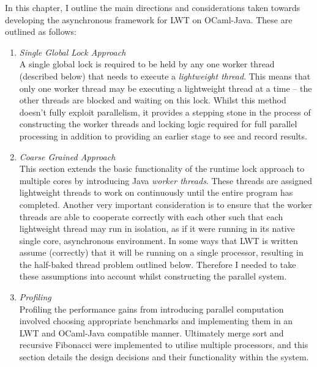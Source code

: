 \documentclass[12pt,twoside,notitlepage]{report}
\begin{document}
%
%

In this chapter, I outline the main directions and considerations taken towards developing the asynchronous framework for LWT on OCaml-Java. These are outlined as follows:
\begin{enumerate}
\item {\em Single Global Lock Approach} \hfill \\
A single global lock is required to be held by any one worker thread (described below) that needs to execute a {\em lightweight thread}. This means that only one worker thread may be executing a lightweight thread at a time -- the other
threads are blocked and waiting on this lock. Whilst this method doesn't fully exploit parallelism, it provides a stepping stone in the process of constructing the worker threads and locking logic required for full parallel processing
in addition to providing an earlier stage to see and record results.
\item {\em Coarse Grained Approach} \hfill \\
This section extends the basic functionality of the runtime lock approach to multiple cores by introducing Java {\em worker threads}. These threads are assigned lightweight threads to work on continuously until the entire program has
completed. Another very important consideration is to ensure that the worker threads are able to cooperate correctly with each other such that each lightweight thread may run in isolation, as if it were running in its native single core,
asynchronous environment. In some ways that LWT is written assume (correctly) that it will be running on a single processor, resulting in the half-baked thread problem outlined below. Therefore I needed to take these assumptions into
account whilst constructing the parallel system.
\item {\em Profiling} \hfill \\
Profiling the performance gains from introducing parallel computation involved choosing appropriate benchmarks and implementing them in an LWT and OCaml-Java compatible manner. Ultimately merge sort and recursive Fibonacci were
implemented to utilise multiple processors, and this section details the design decisions and their functionality within the system.
\end{enumerate}
\end{document}
